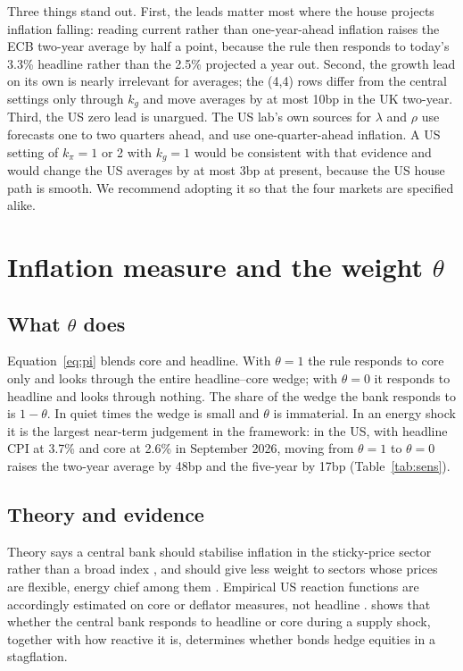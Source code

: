 \documentclass[11pt,a4paper]{article}
\begin{document}
Three things stand out. First, the leads matter most where the house projects inflation falling: reading current rather than one-year-ahead inflation raises the ECB two-year average by half a point, because the rule then responds to today's 3.3\% headline rather than the 2.5\% projected a year out. Second, the growth lead on its own is nearly irrelevant for averages; the (4,4) rows differ from the central settings only through $k_g$ and move averages by at most 10bp in the UK two-year. Third, the US zero lead is unargued. The US lab's own sources for $\lambda$ and $\rho$ use forecasts one to two quarters ahead, and \textcite{cgg2000} use one-quarter-ahead inflation. A US setting of $k_\pi=1$ or 2 with $k_g=1$ would be consistent with that evidence and would change the US averages by at most 3bp at present, because the US house path is smooth. We recommend adopting it so that the four markets are specified alike.

\section{Inflation measure and the weight \texorpdfstring{$\theta$}{theta}}
\label{sec:theta}

\subsection{What $\theta$ does}

Equation~\eqref{eq:pi} blends core and headline. With $\theta=1$ the rule responds to core only and looks through the entire headline--core wedge; with $\theta=0$ it responds to headline and looks through nothing. The share of the wedge the bank responds to is $1-\theta$. In quiet times the wedge is small and $\theta$ is immaterial. In an energy shock it is the largest near-term judgement in the framework: in the US, with headline CPI at 3.7\% and core at 2.6\% in September 2026, moving from $\theta=1$ to $\theta=0$ raises the two-year average by 48bp and the five-year by 17bp (Table~\ref{tab:sens}).

\subsection{Theory and evidence}

Theory says a central bank should stabilise inflation in the sticky-price sector rather than a broad index \parencite{aoki2001}, and should give less weight to sectors whose prices are flexible, energy chief among them \parencite{mankiwreis2003}. Empirical US reaction functions are accordingly estimated on core or deflator measures, not headline \parencite{rudebusch2006,carvalho2021}. \textcite{pflueger2025} shows that whether the central bank responds to headline or core during a supply shock, together with how reactive it is, determines whether bonds hedge equities in a stagflation.
\end{document}
